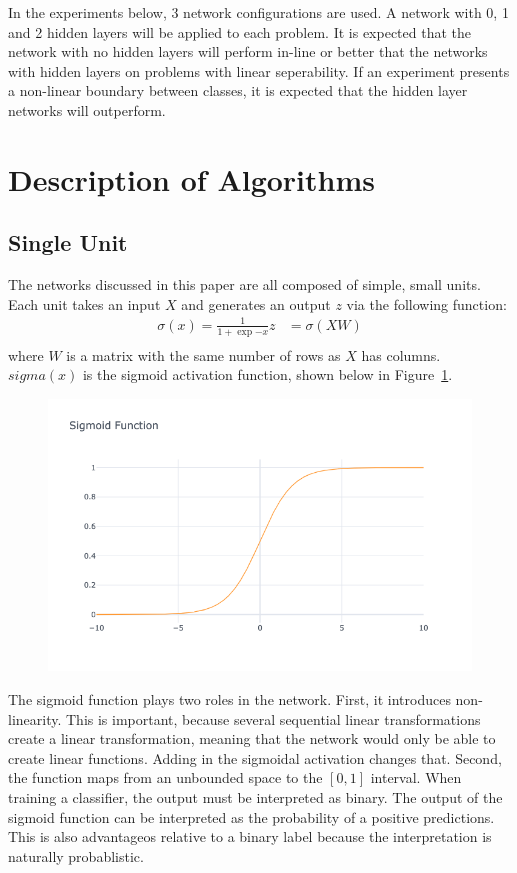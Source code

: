 \documentclass{amsart}
\begin{document}
    In the experiments below, 3 network configurations are used.
    A network with 0, 1 and 2 hidden layers will be applied to
    each problem. It is expected that the network with no hidden
    layers will perform in-line or better that the networks with
    hidden layers on problems with linear seperability. If an
    experiment presents a non-linear boundary between classes,
    it is expected that the hidden layer networks will outperform.

    \section{Description of Algorithms}
    \subsection*{Single Unit}
    The networks discussed in this paper are all composed of
    simple, small units. Each unit takes an input $X$ and
    generates an output $z$ via the following function:
    \begin{align*}
        \sigma(x) = \frac{1}{1 + \exp{-x}}
        z &= \sigma(XW) \\
    \end{align*}
    where $W$ is a matrix with the same number of rows as $X$
    has columns. $sigma(x)$ is the sigmoid activation function, shown
    below in Figure~\ref{sigmoid}.
    \begin{figure}
        \centering
        \includegraphics[width=.6\textwidth]{sigmoid.png}
        \label{sigmoid}
    \end{figure}
    The sigmoid function plays two roles in the network. First, it
    introduces non-linearity. This is important, because several
    sequential linear transformations create a linear transformation,
    meaning that the network would only be able to create
    linear functions. Adding in the sigmoidal activation
    changes that. Second, the function maps from an unbounded space to
    the $[0, 1]$ interval. When training a classifier, the output
    must be interpreted as binary. The output of the sigmoid
    function can be interpreted as the probability of a positive
    predictions. This is also advantageos relative to a binary label
    because the interpretation is naturally probablistic.
\end{document}
